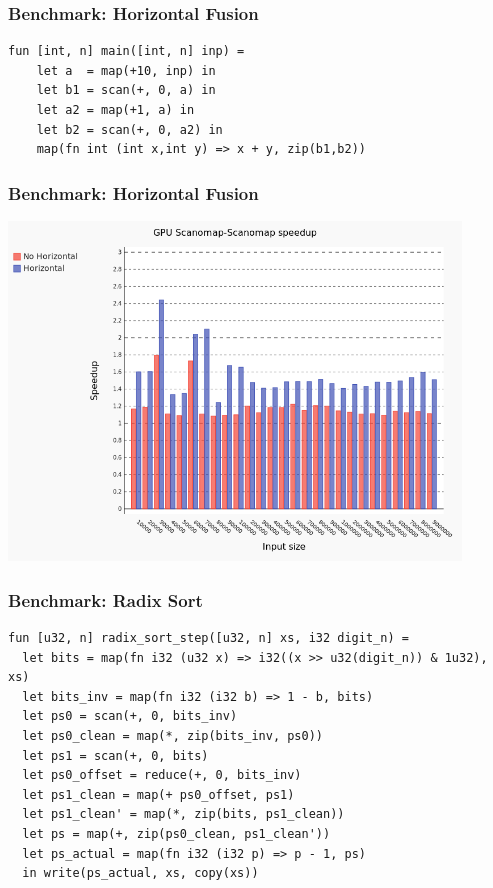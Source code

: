 \documentclass{beamer}
\begin{document}
\begin{frame}[fragile]
 \frametitle{Benchmark: Horizontal Fusion}
\begin{lstlisting}
fun [int, n] main([int, n] inp) =
    let a  = map(+10, inp) in
    let b1 = scan(+, 0, a) in
    let a2 = map(+1, a) in
    let b2 = scan(+, 0, a2) in
    map(fn int (int x,int y) => x + y, zip(b1,b2))
\end{lstlisting}
\end{frame}
\begin{frame}
 \frametitle{Benchmark: Horizontal Fusion}
    \includegraphics[width=0.9\textwidth]{../images/horri-comparing.png}
\end{frame}
\begin{frame}[fragile]
 \frametitle{Benchmark: Radix Sort}
\begin{lstlisting}
fun [u32, n] radix_sort_step([u32, n] xs, i32 digit_n) =
  let bits = map(fn i32 (u32 x) => i32((x >> u32(digit_n)) & 1u32), xs)
  let bits_inv = map(fn i32 (i32 b) => 1 - b, bits)
  let ps0 = scan(+, 0, bits_inv)
  let ps0_clean = map(*, zip(bits_inv, ps0))
  let ps1 = scan(+, 0, bits)
  let ps0_offset = reduce(+, 0, bits_inv)
  let ps1_clean = map(+ ps0_offset, ps1)
  let ps1_clean' = map(*, zip(bits, ps1_clean))
  let ps = map(+, zip(ps0_clean, ps1_clean'))
  let ps_actual = map(fn i32 (i32 p) => p - 1, ps)
  in write(ps_actual, xs, copy(xs))
\end{lstlisting}
\end{frame}
\end{document}
